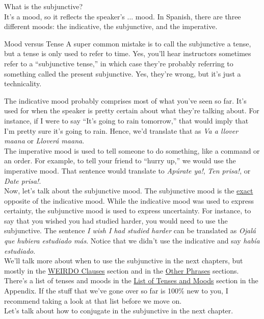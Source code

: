 What is the subjunctive? \\

It's a mood, so it reflects the speaker's ... mood. In Spanish, there are three different moods: the indicative, the subjunctive, and the imperative.
\begin{conf}{Mood versus Tense}
 A super common mistake is to call the subjunctive a tense, but a tense is only used to refer to time. Yes, you'll hear instructors sometimes refer to a ``subjunctive tense,'' in which case they're probably referring to something called the present subjunctive. Yes, they're wrong, but it's just a technicality. 
\end{conf}
The indicative mood probably comprises most of what you've seen so far. It's used for when the speaker is pretty certain about what they're talking about. For instance, if I were to say ``It's going to rain tomorrow,'' that would imply that I'm pretty sure it's going to rain. Hence, we'd translate that as \textit{Va a llover ma{\nye}ana} or \textit{Llover\'{a} ma{\nye}ana}. \\

The imperative mood is used to tell someone to do something, like a command or an order. For example, to tell your friend to ``hurry up,'' we would use the imperative mood. That sentence would translate to \textit{{\exc}Ap\'{u}rate ya!}, \textit{{\exc}Ten prisa!}, or \textit{{\exc}Date prisa!}. \\

Now, let's talk about the subjunctive mood. The subjunctive mood is the \underline{exact} opposite of the indicative mood. While the indicative mood was used to express certainty, the subjunctive mood is used to express uncertainty. For instance, to say that you wished you had studied harder, you would need to use the subjunctive. The sentence \textit{I wish I had studied harder} can be translated as \textit{Ojal\'{a} que hubiera estudiado m\'{a}s}. Notice that we didn't use the indicative and say \textit{hab\'{i}a estudiado}. \\

We'll talk more about when to use the subjunctive in the next chapters, but mostly in the \hyperref[sec:weirdo]{WEIRDO Clauses} section and in the \hyperref[sec:other]{Other Phrases} sections.\\

There's a list of tenses and moods in the \hyperref[subsec:tense]{List of Tenses and Moods} section in the Appendix. If the stuff that we've gone over so far is 100\% new to you, I recommend taking a look at that list before we move on. \\

Let's talk about how to conjugate in the subjunctive in the next chapter. 






